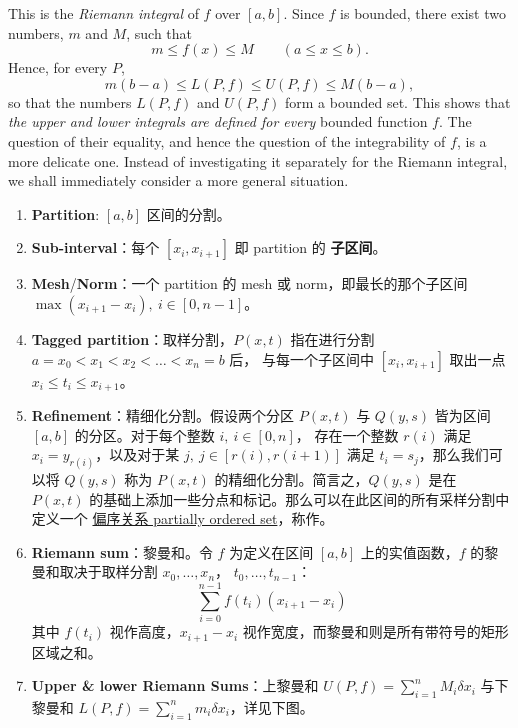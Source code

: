 \documentclass[../poma-notes.tex]{subfiles}
\begin{document}
\begin{definition}
  This is the \textit{Riemann integral} of $f$ over $[a,b]$. Since $f$ is bounded, there exist two numbers,
  $m$ and $M$, such that
  \[
    m \le f(x) \le M \qquad (a \le x \le b).
  \]
  Hence, for every $P$,
  \[
    m(b-a) \le L(P, f) \le U(P, f) \le M(b-a),
  \]
  so that the numbers $L(P, f)$ and $U(P, f)$ form a bounded set. This shows that \textit{the upper and lower
    integrals are defined for every} bounded function $f$. The question of their equality, and hence the question
  of the integrability of $f$, is a more delicate one. Instead of investigating it separately for the Riemann
  integral, we shall immediately consider a more general situation.
\end{definition}

\begin{anote}
  \begin{enumerate}
    \item \textbf{Partition}: $[a, b]$ 区间的分割。
    \item \textbf{Sub-interval}：每个 $[x_i, x_{i+1}]$ 即 partition 的 \textbf{子区间}。
    \item \textbf{Mesh}/\textbf{Norm}：一个 partition 的 mesh 或 norm，即最长的那个子区间 $\max(x_{i+1} - x_i),\ i\in[0, n-1]$。
    \item \textbf{Tagged partition}：取样分割，$P(x,t)$ 指在进行分割 $a = x_0 < x_1 < x_2 < \dots < x_n = b$ 后，
          与每一个子区间中 $[x_i,x_{i+1}]$ 取出一点 $x_i \le t_i \le x_{i+1}$。
    \item \textbf{Refinement}：精细化分割。假设两个分区 $P(x,t)$ 与 $Q(y,s)$ 皆为区间 $[a,b]$ 的分区。对于每个整数 $i,\ i\in[0,n]$，
          存在一个整数 $r(i)$ 满足 $x_i = y_{r(i)}$，以及对于某 $j,\ j\in[r(i),r(i+1)]$ 满足 $t_i = s_j$，那么我们可以将 $Q(y,s)$
          称为 $P(x,t)$ 的精细化分割。简言之，$Q(y,s)$ 是在 $P(x,t)$ 的基础上添加一些分点和标记。那么可以在此区间的所有采样分割中定义一个
          \href{https://en.wikipedia.org/wiki/Partially_ordered_set}{偏序关系 partially ordered set}，称作。
    \item \textbf{Riemann sum}：黎曼和。令 $f$ 为定义在区间 $[a,b]$ 上的实值函数，$f$ 的黎曼和取决于取样分割 $x_0,\dots,x_n$，
          $t_0,\dots,t_{n-1}$：
          \[
            \sum_{i=0}^{n-1}f(t_i)(x_{i+1}-x_i)
          \]
          其中 $f(t_i)$ 视作高度，$x_{i+1} - x_i$ 视作宽度，而黎曼和则是所有带符号的矩形区域之和。
    \item \textbf{Upper \& lower Riemann Sums}：上黎曼和 $U(P,f) = \sum_{i=1}^{n} M_i \delta x_i$ 与下黎曼和
          $L(P,f) = \sum_{i=1}^{n} m_i \delta x_i$，详见下图。

\end{enumerate}
\end{anote}
\end{document}
